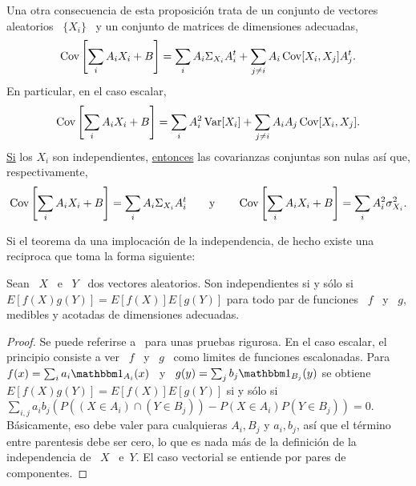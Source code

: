 Una otra  consecuencia de  esta proposici\'on trata  de un conjunto  de vectores
aleatorios \ $\{ X_i \}$ \ y un conjunto de matrices de dimensiones adecuadas,
%
\[
\operatorname{Cov}\left[ \sum_i A_i X_i + B\right] =  \sum_i A_i \Sigma_{X_i} A_i^t + \sum_{j \ne
  i} A_i \operatorname{Cov}[X_i,X_j] A_j^t.
\]
%
En particular, en el caso escalar,
%
\[
\operatorname{Cov}\left[ \sum_i A_i X_i + B \right]  = \sum_i A_i^2 \operatorname{Var}[X_i] + \sum_{j \ne i}
A_i A_j \operatorname{Cov}[X_i,X_j].
\]
%
\underline{Si}   los   $X_i$   son  independientes,   \underline{entonces}   las
covarianzas conjuntas son nulas as\'i que, respectivamente,
\[
\operatorname{Cov}\left[ \sum_i  A_i X_i +  B \right] =  \sum_i A_i \Sigma_{X_i}  A_i^t \qquad
\mbox{y}  \qquad  \operatorname{Cov}\left[  \sum_i  A_i   X_i  +  B  \right]  =  \sum_i  A_i^2
\sigma_{X_i}^2.
\]

Si el  teorema da  una implocaci\'on  de la independencia,  de hecho  existe una
reciproca que toma la forma siguiente:
%
\begin{teorema}
  Sean \ $X$ \ e \ $Y$ \ dos vectores aleatorios. Son independientes si y s\'olo
  si $E[f(X) g(Y)]=E[f(X)] E[g(Y)]$ para todo par  de funciones \ $f$ \ y \ $g$,
  medibles y acotadas de dimensiones adecuadas.
\end{teorema}
%
\begin{proof}
  Se puede referirse a~\cite{Fel71, JacPro03} para unas pruebas rigurosa.  En el
  caso escalar, el  principio consiste a ver \  $f$ \ y \ $g$ \  como limites de
  funciones escalonadas. Para  \ $f(x) = \sum_i a_i \un_{A_i}(x)$ \  y \ $g(y) =
  \sum_j b_j \un_{B_j}(y)$ se obtiene $E[f(X) g(Y)]=E[f(X)] E[g(Y)]$ si y s\'olo
  si $\sum_{i,j} a_i b_j \left( P( (X \in  A_i) \cap (Y \in B_j)) - P(X \in A_i)
    P(Y \in  B_j) \right) = 0$.  B\'asicamente, eso debe  valer para cualquieras
  $A_i, B_j$  y $a_i,  b_j$, as\'i  que el t\'ermino  entre parentesis  debe ser
  cero, lo que es  nada m\'as de la definici\'on de la  independencia de \ $X$ \
  e\ $Y$.  El caso vectorial se entiende por pares de componentes.
\end{proof}

\


